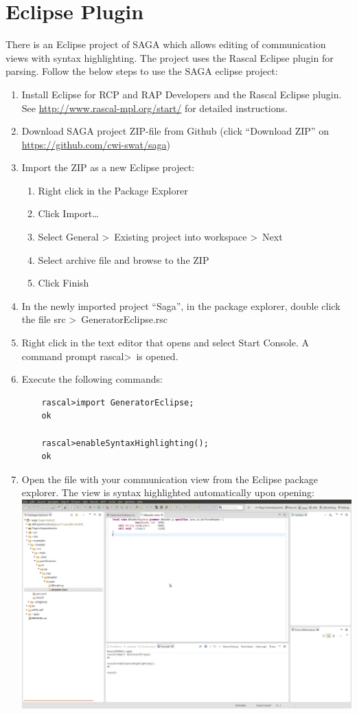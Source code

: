 \documentclass{article}
\begin{document}
\section{Eclipse Plugin}
There is an Eclipse project of SAGA which allows editing of communication views with
syntax highlighting.  The project uses the Rascal Eclipse plugin for parsing.
Follow the below steps to use the SAGA eclipse project:
\begin{enumerate}
  \item Install Eclipse for RCP and RAP Developers and the Rascal Eclipse plugin. See \url{http://www.rascal-mpl.org/start/} for detailed instructions.
  \item Download SAGA project ZIP-file from Github (click ``Download ZIP'' on \url{https://github.com/cwi-swat/saga})
  \item Import the ZIP as a new Eclipse project:
      \begin{enumerate}
         \item Right click in the Package Explorer
         \item Click Import\ldots
         \item Select General \textgreater\ Existing project into workspace \textgreater\ Next
         \item Select archive file and browse to the ZIP
         \item Click Finish
      \end{enumerate}
  \item In the newly imported project ``Saga'', in the package explorer, double click the file src \textgreater\ GeneratorEclipse.rsc
  \item Right click in the text editor that opens and select Start Console. A command prompt rascal\textgreater\ is opened.
  \item Execute the following commands:
\begin{lstlisting}
    rascal>import GeneratorEclipse;
    ok

    rascal>enableSyntaxHighlighting();
    ok
\end{lstlisting}
  \item Open the file with your communication view from the Eclipse package explorer.  The view is syntax highlighted automatically upon opening:
  \includegraphics[scale=0.2]{syntaxHighlighting}
\end{enumerate}





\end{document}
